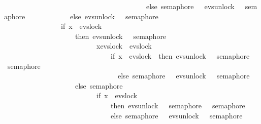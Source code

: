 \begin{isabellebody}
\ \ \ \ \ \ \ \ \ \ \ \ \ \ \ \ \ \ \ \ \ \ \ \ \ \ \ \ \ \ \ \ \ \ \ \ \ \ \ \ else\ semaphore\ {}\ {\isacharbar}{\kern0pt}{\isacharbar}{\kern0pt}{\isacharbar}{\kern0pt}\ evs{\isachardot}{\kern0pt}unlock\ {}\ {\isasymrightarrow}\ semaphore\ {}{\isacharparenright}{\kern0pt}{\isacharparenright}{\kern0pt}\isanewline
\ \ \ \ \ \ \ \ \ \ \ else\ evs{\isachardot}{\kern0pt}unlock\ {}\ {\isasymrightarrow}\ semaphore\ {}\isanewline
\ \ \ \ \ \ \ \ \ \ \ \ \ \ \ {\isacharbar}{\kern0pt}{\isacharbar}{\kern0pt}{\isacharbar}{\kern0pt}\ {\isacharparenleft}{\kern0pt}if\ x\ {\isacharequal}{\kern0pt}\ evs{\isachardot}{\kern0pt}lock\ {}\isanewline
\ \ \ \ \ \ \ \ \ \ \ \ \ \ \ \ \ \ \ \ then\ evs{\isachardot}{\kern0pt}unlock\ {}\ {\isasymrightarrow}\ semaphore\ {}\isanewline
\ \ \ \ \ \ \ \ \ \ \ \ \ \ \ \ \ \ \ \ \ \ \ \ \ {\isacharbar}{\kern0pt}{\isacharbar}{\kern0pt}{\isacharbar}{\kern0pt}\ {\isasymbox}x{\isasymin}{\isacharbraceleft}{\kern0pt}evs{\isachardot}{\kern0pt}lock\ {}{\isacharcomma}{\kern0pt}\ evs{\isachardot}{\kern0pt}lock\ {}{\isacharbraceright}{\kern0pt}\isanewline
\ \ \ \ \ \ \ \ \ \ \ \ \ \ \ \ \ \ \ \ \ \ \ \ \ \ \ \ \ {\isasymrightarrow}\ {\isacharparenleft}{\kern0pt}if\ x\ {\isacharequal}{\kern0pt}\ evs{\isachardot}{\kern0pt}lock\ {}\ then\ evs{\isachardot}{\kern0pt}unlock\ {}\ {\isasymrightarrow}\ semaphore\ {}\ {\isacharbar}{\kern0pt}{\isacharbar}{\kern0pt}{\isacharbar}{\kern0pt}\ semaphore\ {}\isanewline
\ \ \ \ \ \ \ \ \ \ \ \ \ \ \ \ \ \ \ \ \ \ \ \ \ \ \ \ \ \ \ \ else\ semaphore\ {}\ {\isacharbar}{\kern0pt}{\isacharbar}{\kern0pt}{\isacharbar}{\kern0pt}\ evs{\isachardot}{\kern0pt}unlock\ {}\ {\isasymrightarrow}\ semaphore\ {}{\isacharparenright}{\kern0pt}\isanewline
\ \ \ \ \ \ \ \ \ \ \ \ \ \ \ \ \ \ \ \ else\ semaphore\ {}\ \isanewline
\ \ \ \ \ \ \ \ \ \ \ \ \ \ \ \ \ \ \ \ \ \ \ \ \ {\isacharbar}{\kern0pt}{\isacharbar}{\kern0pt}{\isacharbar}{\kern0pt}\ {\isacharparenleft}{\kern0pt}if\ x\ {\isacharequal}{\kern0pt}\ evs{\isachardot}{\kern0pt}lock\ {}\isanewline
\ \ \ \ \ \ \ \ \ \ \ \ \ \ \ \ \ \ \ \ \ \ \ \ \ \ \ \ \ \ then\ evs{\isachardot}{\kern0pt}unlock\ {}\ {\isasymrightarrow}\ semaphore\ {}\ {\isacharbar}{\kern0pt}{\isacharbar}{\kern0pt}{\isacharbar}{\kern0pt}\ semaphore\ {}\isanewline
\ \ \ \ \ \ \ \ \ \ \ \ \ \ \ \ \ \ \ \ \ \ \ \ \ \ \ \ \ \ else\ semaphore\ {}\ {\isacharbar}{\kern0pt}{\isacharbar}{\kern0pt}{\isacharbar}{\kern0pt}\ evs{\isachardot}{\kern0pt}unlock\ {}\ {\isasymrightarrow}\ semaphore\ {}{\isacharparenright}{\kern0pt}{\isacharparenright}{\kern0pt}{\isacharparenright}{\kern0pt}{\isachardoublequoteclose}\isanewline

\end{isabellebody}
